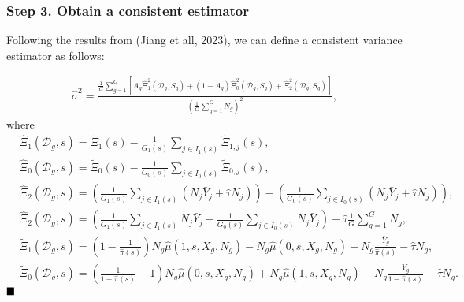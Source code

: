 \documentclass{article}
\renewcommand{\qed}{\hfill\blacksquare}
\begin{document}
\subsubsection*{Step 3. Obtain a consistent estimator}
Following the results from (Jiang et all, 2023), we can define a consistent variance estimator as follows: 

\begin{align}
	\hat{\sigma}^2 = \frac{\frac{1}{G} \sum_{g=1}^G \left[A_g\hat{\Xi}_{1}^2(\mathcal D_g, S_g) + (1- A_g) \hat{\Xi}_{0}^2(\mathcal D_g, S_g) + \hat{\Xi}_2^2(\mathcal D_g, S_g) \right]}{(\frac{1}{G}\sum_{g=1}^G N_g)^2}, \nonumber
\end{align}
where 
\begin{align}
	&\hat{\Xi}_{1}(\mathcal D_g, s) = \tilde{\Xi}_{1}(s) - \frac{1}{G_1(s)} \sum_{j \in I_1(s)} \tilde{\Xi}_{1,j}(s) \nonumber, \\
	&\hat{\Xi}_{0}(\mathcal D_g, s) = \tilde{\Xi}_{0}(s) - \frac{1}{G_0(s)} \sum_{j \in I_0(s)} \tilde{\Xi}_{0,j}(s) \nonumber , \\
	& \hat{\Xi}_{2}(\mathcal D_g, s) = \left( \frac{1}{G_1(s)} \sum_{j \in I_1(s)} \left(N_j \bar{Y}_j + \hat{\tau}  N_j \right) \right) - \left( \frac{1}{G_0(s)} \sum_{j \in I_0 (s)} \left(N_j \bar{Y}_j + \hat{\tau} N_j \right) \right), \nonumber \\
	& \hat{\Xi}_{2}(\mathcal D_g, s) = \left( \frac{1}{G_1(s)} \sum_{j \in I_1(s)} N_j \bar{Y}_j  -  \frac{1}{G_0(s)} \sum_{j \in I_0 (s)} N_j \bar{Y}_j \right) + \hat{\tau} \frac{1}{G} \sum_{g=1}^G N_g, \nonumber \\
	&\tilde{\Xi}_{1}(\mathcal D_g, s) = \left(1 - \frac{1}{\hat{\pi}(s)} \right)N_g\hat{\mu}(1,s,X_g,N_g) - N_g\hat{\mu}(0,s,X_g,N_g) + N_g\frac{\bar{Y}_g}{\hat{\pi}(s)} - \hat{\tau} N_g, \nonumber \\
	& \tilde{\Xi}_{0}(\mathcal D_g, s) = \left(\frac{1}{1 - \hat{\pi}(s)} - 1 \right)N_g\hat{\mu}(0,s,X_g,N_g) + N_g\hat{\mu}(1,s,X_g,N_g) - N_g\frac{\bar{Y}_g}{1-\hat{\pi}(s)} - \hat{\tau} N_g. \nonumber
\end{align}
\hfill $\qed$
\end{document}
